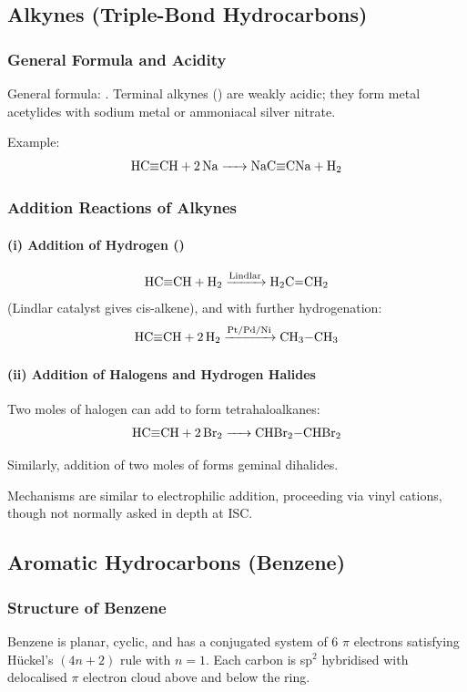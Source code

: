 \documentclass[12pt,a4paper]{article}
\begin{document}
\subsection{Alkynes (Triple-Bond Hydrocarbons)}

\subsubsection{General Formula and Acidity}
General formula: .  
Terminal alkynes () are weakly acidic; they form metal acetylides with sodium metal or ammoniacal silver nitrate.

Example:
\[
\ce{HC{\equiv}CH + 2Na -> NaC{\equiv}CNa + H2}
\]

\subsubsection{Addition Reactions of Alkynes}

\paragraph{(i) Addition of Hydrogen ()}
\[
\ce{HC{\equiv}CH + H2 ->[Lindlar] H2C=CH2}
\]
(Lindlar catalyst gives cis-alkene), and with further hydrogenation:
\[
\ce{HC{\equiv}CH + 2H2 ->[Pt/Pd/Ni] CH3-CH3}
\]

\paragraph{(ii) Addition of Halogens and Hydrogen Halides}
Two moles of halogen can add to form tetrahaloalkanes:
\[
\ce{HC{\equiv}CH + 2Br2 -> CHBr2-CHBr2}
\]

Similarly, addition of two moles of  forms geminal dihalides.

Mechanisms are similar to electrophilic addition, proceeding via vinyl cations, though not normally asked in depth at ISC.

\subsection{Aromatic Hydrocarbons (Benzene)}

\subsubsection{Structure of Benzene}
Benzene is planar, cyclic, and has a conjugated system of 6 $\pi$ electrons satisfying Hückel's $(4n+2)$ rule with $n=1$.  
Each carbon is sp$^2$ hybridised with delocalised $\pi$ electron cloud above and below the ring.
\end{document}
